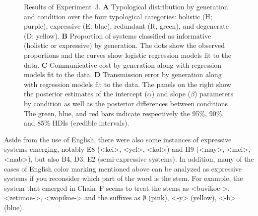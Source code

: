 \documentclass[doc,biblatex]{apa7}
\begin{document}
	\begin{figure}
	\vspace*{2pt}
	\caption{Results of Experiment~3. \textbf{A} Typological distribution by generation and condition over the four typological categories: holistic (H; purple), expressive (E; blue), redundant (R, green), and degenerate (D; yellow). \textbf{B} Proportion of systems classified as informative (holistic or expressive) by generation. The dots show the observed proportions and the curves show logistic regression models fit to the data. \textbf{C} Communicative cost by generation along with regression models fit to the data. \textbf{D} Transmission error by generation along with regression models fit to the data. The panels on the right show the posterior estimates of the intercept ($\alpha$) and slope ($\beta$) parameters by condition as well as the posterior differences between conditions. The green, blue, and red bars indicate respectively the 95\%, 90\%, and 85\% HDIs (credible intervals).}
	\label{results_exp3}
	\end{figure}

Aside from the use of English, there were also some instances of expressive systems emerging, notably E8 (<kei>, <yel>, <kol>) and H9 (<may>, <mei>, <mab>), but also B4, D3, E2 (semi-expressive systems). In addition, many of the cases of English color marking mentioned above can be analyzed as expressive systems if you reconsider which part of the word is the stem. For example, the system that emerged in Chain~F seems to treat the stems as <buvikoe->, <zetimoe->, <wopikoe-> and the suffixes as $\emptyset$ (pink), <-y> (yellow), <-b> (blue).
\end{document}

